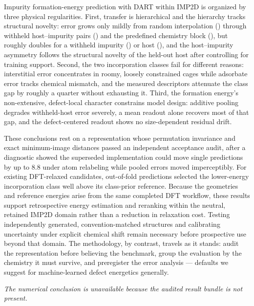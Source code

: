 
\ifprmresultsready

Impurity formation-energy prediction with DART within IMP2D is organized by
three physical regularities.  First, transfer is hierarchical and the hierarchy
tracks structural novelty: error grows only mildly from random
interpolation (\PRMRepIdCvMAE\eV{}) through withheld host--impurity pairs
(\PRMRepPairCvMAE\eV{}) and the predefined chemistry block
(\PRMRepChemBlockMAE\eV{}), but roughly doubles for a withheld impurity
(\PRMRepDopantCvMAE\eV{}) or host (\PRMRepHostCvMAE\eV{}), and the
host--impurity asymmetry follows the structural novelty of the held-out
host after controlling for training support.  Second, the two incorporation
classes fail for different reasons: interstitial error concentrates in
roomy, loosely constrained cages while adsorbate error tracks chemical
mismatch, and the measured descriptors attenuate the class gap by roughly
a quarter without exhausting it.  Third, the formation energy's
non-extensive, defect-local character constrains model design: additive
pooling degrades withheld-host error severely, a mean readout alone
recovers most of that gap, and the defect-centered readout shows no
size-dependent residual drift.

These conclusions rest on a representation whose permutation invariance and
exact minimum-image distances passed an independent acceptance audit, after
a diagnostic showed the superseded implementation could move single
predictions by up to $8.8$\eV{} under atom relabeling while pooled errors
moved imperceptibly.  For existing DFT-relaxed candidates, out-of-fold
predictions selected the lower-energy incorporation class well above its
class-prior reference.  Because the geometries
and reference energies arise from the same completed DFT workflow, these
results support retrospective energy estimation and reranking within the
neutral, retained IMP2D domain rather than a reduction in relaxation cost.
Testing independently generated, convention-matched structures and
calibrating uncertainty under explicit chemical shift remain necessary
before prospective use beyond that domain.  The methodology, by contrast,
travels as it stands: audit the representation before believing the
benchmark, group the evaluation by the chemistry it must survive, and
preregister the error analysis --- defaults we suggest for machine-learned
defect energetics generally.

\else

\noindent\textit{The numerical conclusion is unavailable because the audited
result bundle is not present.}

\fi
